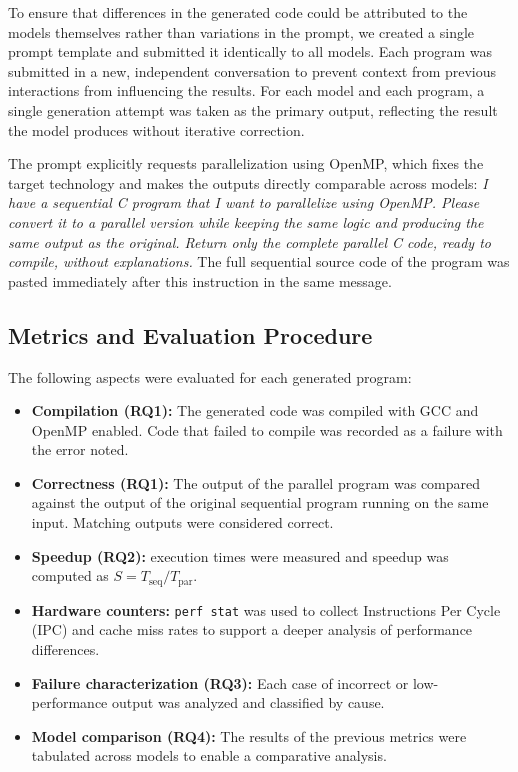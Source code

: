 \documentclass[conference]{IEEEtran}
\begin{document}
To ensure that differences in the generated code could be attributed to the models themselves rather than variations in the prompt, we created a single prompt template and submitted it  identically to all models.
Each program was submitted in a new, independent conversation to prevent context from previous interactions from influencing the results.
For each model and each program, a single generation attempt was taken as the primary output, reflecting the result the model produces without iterative correction.

The prompt explicitly requests parallelization using OpenMP, which fixes the target technology and makes the outputs directly comparable across models: 
\textit{I have a sequential C program that I want to parallelize using OpenMP. 
Please convert it to a parallel version while keeping the same logic and producing the same output as the original. 
Return only the complete parallel C code, ready to compile, without explanations.}
The full sequential source code of the program was pasted immediately after this instruction in the same message.

\subsection{Metrics and Evaluation Procedure} \label{sec:metrics}

The following aspects were evaluated for each generated program: 
\begin{itemize}
\item \textbf{Compilation (RQ1):} The generated code was compiled with GCC and OpenMP enabled. Code that failed to compile was recorded as a failure with the error noted.
\item \textbf{Correctness (RQ1):} The output of the parallel program was compared against the output of the original sequential program running on the same input. Matching outputs were considered correct.
\item \textbf{Speedup (RQ2):} execution times were measured and speedup was computed as $S = T_{\text{seq}} / T_{\text{par}}$.
\item \textbf{Hardware counters:} \texttt{perf stat} was used to collect Instructions Per Cycle (IPC) and cache miss rates to support a deeper analysis of performance differences.
\item \textbf{Failure characterization (RQ3):} Each case of incorrect or low-performance output was analyzed and classified by cause.
\item \textbf{Model comparison (RQ4):} The results of the previous metrics were tabulated across models to enable a comparative analysis.
\end{itemize}
\end{document}
